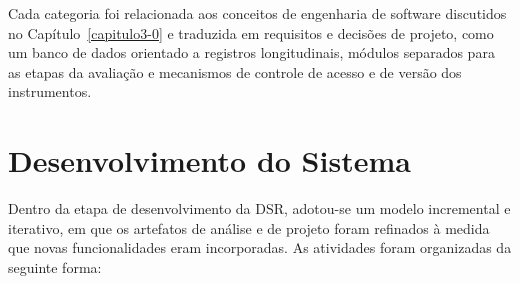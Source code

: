 Cada categoria foi relacionada aos conceitos de engenharia de software discutidos no Capítulo~\ref{capitulo3-0} e traduzida em requisitos e decisões de projeto, como um banco de dados orientado a registros longitudinais, módulos separados para as etapas da avaliação e mecanismos de controle de acesso e de versão dos instrumentos.

\section{Desenvolvimento do Sistema}

Dentro da etapa de desenvolvimento da DSR, adotou-se um modelo incremental e iterativo, em que os artefatos de análise e de projeto foram refinados à medida que novas funcionalidades eram incorporadas. As atividades foram organizadas da seguinte forma:

